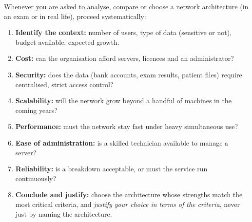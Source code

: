 \documentclass[11pt]{article}
\begin{document}
\begin{methode}
Whenever you are asked to analyse, compare or choose a network architecture (in an exam or in real life), proceed systematically:
\begin{enumerate}
\item \textbf{Identify the context:} number of users, type of data (sensitive or not), budget available, expected growth.
\item \textbf{Cost:} can the organisation afford servers, licences and an administrator?
\item \textbf{Security:} does the data (bank accounts, exam results, patient files) require centralised, strict access control?
\item \textbf{Scalability:} will the network grow beyond a handful of machines in the coming years?
\item \textbf{Performance:} must the network stay fast under heavy simultaneous use?
\item \textbf{Ease of administration:} is a skilled technician available to manage a server?
\item \textbf{Reliability:} is a breakdown acceptable, or must the service run continuously?
\item \textbf{Conclude and justify:} choose the architecture whose strengths match the most critical criteria, and \emph{justify your choice in terms of the criteria}, never just by naming the architecture.
\end{enumerate}
\end{methode}
\end{document}

